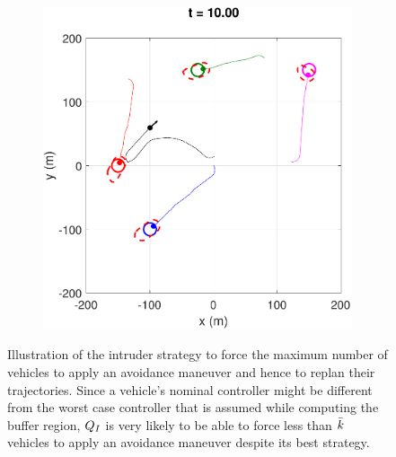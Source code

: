 \begin{figure}[H]
\begin{subfigure}{.5\columnwidth}
  \subcaption{}
  \label{fig:normalcase2}
\end{subfigure}
\begin{subfigure}{.5\columnwidth}
  \centering
  \includegraphics[width=\columnwidth]{figs/simulate_bufferRegion_properties_normal_3}
  \subcaption{}
  \label{fig:normalcase3}
\end{subfigure}%
\caption{Illustration of the intruder strategy to force the maximum number of vehicles to apply an avoidance maneuver and hence to replan their trajectories. Since a vehicle's nominal controller might be different from the worst case controller that is assumed while computing the buffer region, $Q_{I}$ is very likely to be able to force less than $\bar{k}$ vehicles to apply an avoidance maneuver despite its best strategy.}
\label{fig:normalcase}
\end{figure}         

